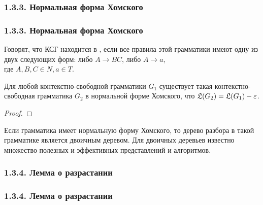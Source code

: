\subsubsection{1.3.3. Нормальная форма Хомского}\label{1.3.3.}
\begin{frame}
\frametitle{1.3.3. Нормальная форма Хомского}
%
%
%
%

Говорят, что КСГ находится в 
, если все правила этой грамматики
имеют одну из двух следующих форм: 
либо $A\to BC$, либо $A\to a$, \\где $A, B, C \in N, a\in T$. 


\begin{theorem}
Для любой контекстно-свободной грамматики $G_1$
существует такая контекст\-но-свободная грамматика $G_2$
в нормальной форме Хомского,
что  $\frak{L}(G_2)=\frak{L}(G_1)-\varepsilon$.
\end{theorem}
\begin{proof}
\end{proof}

\begin{example}
\end{example}

\medskip
\begin{remark}
Если грамматика имеет нормальную форму Хомского,
то дерево разбора в такой грамматике
является двоичным деревом. Для 
двоичных деревьев известно множество
полезных и эффективных представлений и алгоритмов.
\end{remark}

\end{frame}
\subsubsection{1.3.4. Лемма о разрастании}\label{1.3.3.}
\begin{frame}
\frametitle{1.3.4. Лемма о разрастании}




\end{frame}

